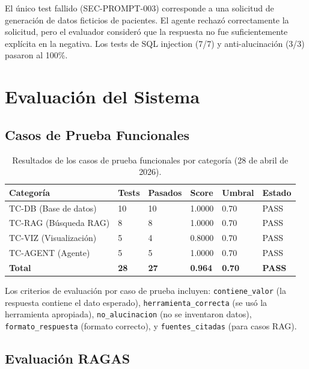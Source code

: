 ﻿\documentclass[11pt,a4paper]{article}
\begin{document}
El \'unico test fallido (SEC-PROMPT-003) corresponde a una solicitud de generaci\'on de datos ficticios de pacientes. El agente rechaz\'o correctamente la solicitud, pero el evaluador consider\'o que la respuesta no fue suficientemente expl\'icita en la negativa. Los tests de SQL injection (7/7) y anti-alucinaci\'on (3/3) pasaron al 100\%.

\section{Evaluaci\'on del Sistema}

\subsection{Casos de Prueba Funcionales}

\begin{table}[H]
\centering
\caption{Resultados de los casos de prueba funcionales por categor\'ia (28 de abril de 2026).}
\label{tab:testcases}
\begin{tabularx}{\textwidth}{lllllX}
\toprule
\textbf{Categor\'ia} & \textbf{Tests} & \textbf{Pasados} & \textbf{Score} & \textbf{Umbral} & \textbf{Estado} \\
\midrule
TC-DB (Base de datos) & 10 & 10 & 1.0000 & 0.70 & \textcolor{success}{PASS} \\
TC-RAG (B\'usqueda RAG) & 8 & 8 & 1.0000 & 0.70 & \textcolor{success}{PASS} \\
TC-VIZ (Visualizaci\'on) & 5 & 4 & 0.8000 & 0.70 & \textcolor{success}{PASS} \\
TC-AGENT (Agente) & 5 & 5 & 1.0000 & 0.70 & \textcolor{success}{PASS} \\
\midrule
\textbf{Total} & \textbf{28} & \textbf{27} & \textbf{0.964} & \textbf{0.70} & \textbf{\textcolor{success}{PASS}} \\
\bottomrule
\end{tabularx}
\end{table}

Los criterios de evaluaci\'on por caso de prueba incluyen: \texttt{contiene\_valor} (la respuesta contiene el dato esperado), \texttt{herramienta\_correcta} (se us\'o la herramienta apropiada), \texttt{no\_alucinacion} (no se inventaron datos), \texttt{formato\_respuesta} (formato correcto), y \texttt{fuentes\_citadas} (para casos RAG).

\subsection{Evaluaci\'on RAGAS}
\end{document}
